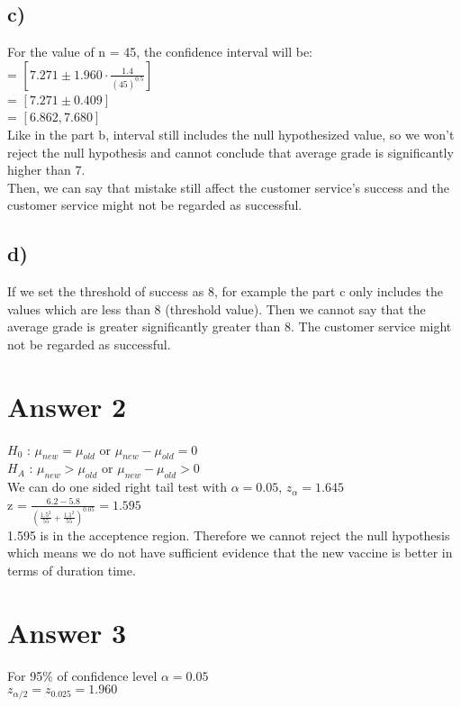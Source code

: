 \documentclass[12pt]{article}
\begin{document}
\newpage

\subsection*{c)}
For the value of n = 45, the confidence interval will be:\\
= $[ 7.271 \pm 1.960\cdot\frac{1.4}{(45)^{0.5}}]$\\
= $[ 7.271 \pm 0.409]$\\
= $[ 6.862, 7.680]$\\
Like in the part b, interval still includes the null hypothesized value, so we won't reject the null hypothesis and cannot conclude that average grade is significantly higher than 7.\\
Then, we can say that mistake still affect the customer service’s success and the customer service might not be regarded as successful.\\

\subsection*{d)}
If we set the threshold of success as 8, for example the part c only includes the values which are less than 8 (threshold value). Then we cannot say that the average grade is greater significantly greater than 8. The customer service might not be regarded as successful.\\

\section*{Answer 2}
$H_0$ : $\mu_{new} = \mu_{old}$ or $\mu_{new} - \mu_{old} = 0$\\
$H_A$ : $\mu_{new} > \mu_{old}$ or $\mu_{new} - \mu_{old} > 0$\\
We can do one sided right tail test with $\alpha = 0.05$, $z_\alpha = 1.645$\\
z =  $\frac{6.2 - 5.8}{(\frac{1.5^2}{55} + \frac{1.1^2}{55})^{0.05}} = 1.595$\\
1.595 is in the acceptence region. Therefore we cannot reject the null hypothesis which means we do not have sufficient evidence that the new vaccine is better in terms of duration time.\\
\section*{Answer 3} 
For 95\% of confidence level $\alpha = 0.05$\\
$z_{\alpha/2} = z_{0.025} = 1.960$ \\
\end{document}
